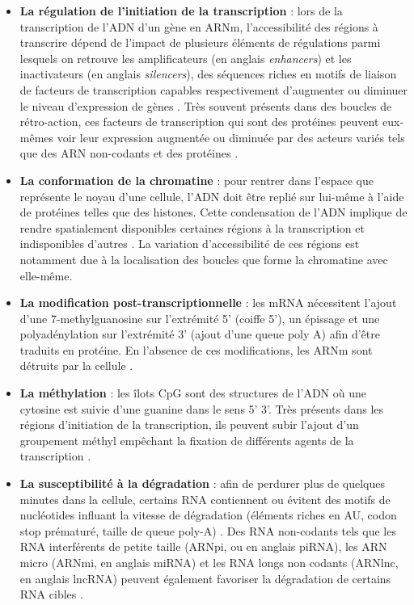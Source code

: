 \begin{itemize}
    \item \textbf{La régulation de l'initiation de la transcription} : lors de la transcription de l'\acrshort{ADN} d'un gène en ARNm, l'accessibilité des régions à transcrire dépend de l'impact de plusieurs éléments de régulations parmi lesquels on retrouve les amplificateurs (en anglais \textit{enhancers}) et les inactivateurs (en anglais \textit{silencers}), des séquences riches en motifs de liaison de facteurs de transcription capables respectivement d'augmenter ou diminuer le niveau d'expression de gènes \cite{Levo2014Jul}. Très souvent présents dans des boucles de rétro-action, ces facteurs de transcription qui sont des protéines peuvent eux-mêmes voir leur expression augmentée ou diminuée par des acteurs variés tels que des \acrshort{ARN} non-codants et des protéines \cite{Chen2020May}.
    \item \textbf{La conformation de la chromatine} : pour rentrer dans l'espace que représente le noyau d'une cellule, l'\acrshort{ADN} doit être replié sur lui-même à l'aide de protéines telles que des histones. Cette condensation de l'\acrshort{ADN} implique de rendre spatialement disponibles certaines régions à la transcription et indisponibles d'autres \cite{Kadauke2009Jan}.
    La variation d'accessibilité de ces régions est notamment due à la localisation des boucles que forme la chromatine avec elle-même.
    \item \textbf{La modification post-transcriptionnelle} : les \acrshort{mRNA} nécessitent l'ajout d'une 7-methylguanosine sur l'extrémité 5' (coiffe 5'), un épissage et une polyadénylation sur l'extrémité 3' (ajout d'une queue poly A) afin d'être traduits en protéine. En l'absence de ces modifications, les ARNm sont détruits par la cellule \cite{Mercer2010Nov}.
    \item \textbf{La méthylation} : les îlots CpG sont des structures de l'\acrshort{ADN} où une cytosine est suivie d'une guanine dans le sens 5' \textrightarrow{} 3'. Très présents dans les régions d'initiation de la transcription, ils peuvent subir l'ajout d'un groupement méthyl empêchant la fixation de différents agents de la transcription \cite{Gutierrez-Arcelus2013Jun}.
    \item \textbf{La susceptibilité à la dégradation} : afin de perdurer plus de quelques minutes dans la cellule, certains \acrshort{RNA} contiennent ou évitent des motifs de nucléotides influant la vitesse de dégradation (éléments riches en AU, codon stop prématuré, taille de queue poly-A) \cite{Yu2001}. Des \acrshort{RNA} non-codants tels que les \acrshort{RNA} interférents de petite taille (\acrshort{ARNpi}, ou en anglais piRNA), les ARN micro (\acrshort{ARNmi}, en anglais miRNA) et les \acrshort{RNA} longs non codants (\acrshort{ARNlnc}, en anglais lncRNA) peuvent également favoriser la dégradation de certains \acrshort{RNA} cibles \cite{Patil2014Jan}.

\end{itemize}

